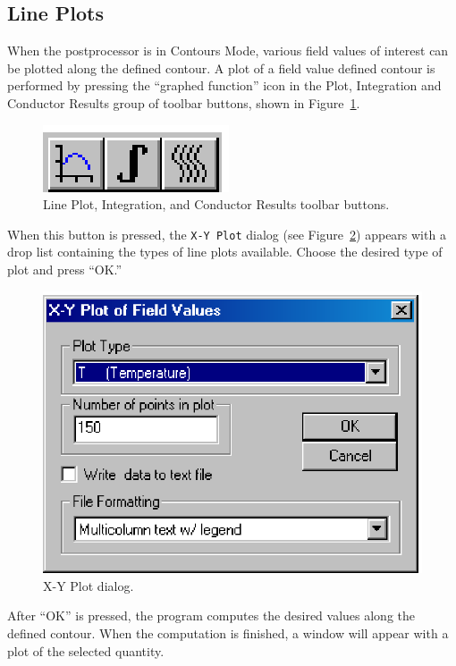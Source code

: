 \subsection{Line Plots}

When the postprocessor is in Contours Mode, various field values of
interest can be plotted along the defined contour. A plot of a
field value defined contour is performed by pressing the ``graphed
function'' icon in the Plot, Integration and Conductor Results group of toolbar
buttons, shown in Figure~\ref{hfig18}.

\begin{figure}[htbp]
\centerline{\includegraphics{hresbar.ps}}
\caption{Line Plot, Integration, and Conductor Results toolbar buttons.}
\label{hfig18}
\end{figure}

When this button is pressed, the \texttt{X-Y Plot} dialog (see
Figure~\ref{hfig19}) appears with a drop list containing the types
of line plots available. Choose the desired type of plot and press
``OK.''

\begin{figure}[htbp]
\centerline{\includegraphics{hpltdlg.ps}}
\caption{X-Y Plot dialog.}
\label{hfig19}
\end{figure}

After ``OK'' is pressed, the program computes the desired values
along the defined contour. When the computation is finished, a window
will appear with a plot of the selected quantity.

